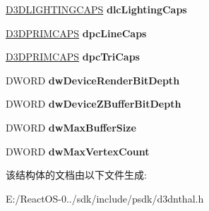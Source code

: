 \begin{DoxyCompactItemize}
\hyperlink{struct___d3_d_l_i_g_h_t_i_n_g_c_a_p_s}{D3\+D\+L\+I\+G\+H\+T\+I\+N\+G\+C\+A\+PS} {\bfseries dlc\+Lighting\+Caps}
\item 
\mbox{\label{struct___d3_d_n_t_h_a_l_device_desc___v1_a860f3671c242ff03f5d18506b2211fd1}} 
\hyperlink{struct___d3_d_prim_caps}{D3\+D\+P\+R\+I\+M\+C\+A\+PS} {\bfseries dpc\+Line\+Caps}
\item 
\mbox{\label{struct___d3_d_n_t_h_a_l_device_desc___v1_a134bfd2b0bb6f2d2e49ec9ae6709c7a0}} 
\hyperlink{struct___d3_d_prim_caps}{D3\+D\+P\+R\+I\+M\+C\+A\+PS} {\bfseries dpc\+Tri\+Caps}
\item 
\mbox{\label{struct___d3_d_n_t_h_a_l_device_desc___v1_a177f88487b8e7f15fef40c7ba776bbe2}} 
D\+W\+O\+RD {\bfseries dw\+Device\+Render\+Bit\+Depth}
\item 
\mbox{\label{struct___d3_d_n_t_h_a_l_device_desc___v1_a222fceefba7ffb395ba45465a9a175a5}} 
D\+W\+O\+RD {\bfseries dw\+Device\+Z\+Buffer\+Bit\+Depth}
\item 
\mbox{\label{struct___d3_d_n_t_h_a_l_device_desc___v1_a79a2ab12c1722e9a54e3f03168211122}} 
D\+W\+O\+RD {\bfseries dw\+Max\+Buffer\+Size}
\item 
\mbox{\label{struct___d3_d_n_t_h_a_l_device_desc___v1_a09b6f3504275a8acd163f3048c7a1153}} 
D\+W\+O\+RD {\bfseries dw\+Max\+Vertex\+Count}
\end{DoxyCompactItemize}


该结构体的文档由以下文件生成\+:\begin{DoxyCompactItemize}
\item 
E\+:/\+React\+O\+S-\/0../sdk/include/psdk/d3dnthal.\+h\end{DoxyCompactItemize}
